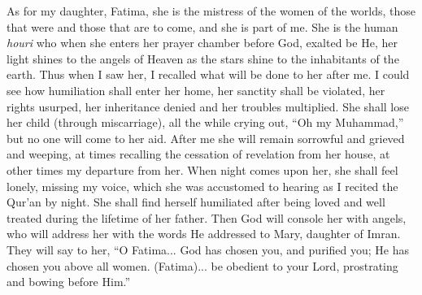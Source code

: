\begin{quotationx}
As for my daughter, Fatima, she is the mistress of the women of the worlds, those that were and those that are to come, and she is part of me. She is the human \emph{houri} who when she enters her prayer chamber before God, exalted be He, her light shines to the angels of Heaven as the stars shine to the inhabitants of the earth. Thus when I saw her, I recalled what will be done to her after me. I could see how humiliation shall enter her home, her sanctity shall be violated, her rights usurped, her inheritance denied and her troubles multiplied. She shall lose her child (through miscarriage), all the while crying out, ``Oh my Muhammad,'' but no one will come to her aid. After me she will remain sorrowful and grieved and weeping, at times recalling the cessation of revelation from her house, at other times my departure from her. When night comes upon her, she shall feel lonely, missing my voice, which she was accustomed to hearing as I recited the Qur'an by night. She shall find herself humiliated after being loved and well treated during the lifetime of her father. Then God will console her with angels, who will address her with the words He addressed to Mary, daughter of Imran. They will say to her, ``O Fatima... God has chosen you, and purified you; He has chosen you above all women. (Fatima)... be obedient to your Lord, prostrating and bowing before Him.''


\end{quotationx}
